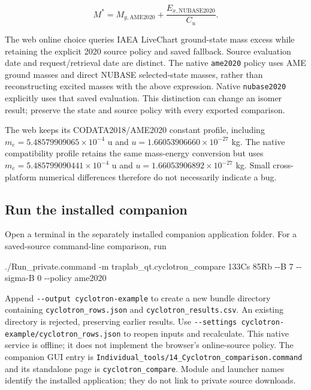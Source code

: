 \documentclass[
  aps,
  onecolumn,
  11pt]{revtex4-2}
\newenvironment{Shaded}{}{}
\newcommand{\AttributeTok}[1]{\textcolor[rgb]{0.49,0.56,0.16}{#1}}
\newcommand{\ExtensionTok}[1]{#1}
\newcommand{\NormalTok}[1]{#1}
\begin{document}
\[M^*=M_{g,\mathrm{AME2020}}+\frac{E_{x,\mathrm{NUBASE2020}}}{C_u}.\]

The web online choice queries IAEA LiveChart ground-state mass excess
while retaining the explicit 2020 source policy and saved fallback.
Source evaluation date and request/retrieval date are distinct. The
native \texttt{ame2020} policy uses AME ground masses and direct NUBASE
selected-state masses, rather than reconstructing excited masses with
the above expression. Native \texttt{nubase2020} explicitly uses that
saved evaluation. This distinction can change an isomer result; preserve
the state and source policy with every exported comparison.

The web keeps its CODATA2018/AME2020 constant profile, including
\(m_e=5.48579909065\times10^{-4}\) u and
\(u=1.66053906660\times10^{-27}\) kg. The native compatibility profile
retains the same mass-energy conversion but uses
\(m_e=5.485799090441\times10^{-4}\) u and
\(u=1.66053906892\times10^{-27}\) kg. Small cross-platform numerical
differences therefore do not necessarily indicate a bug.

\subsection{Run the installed
companion}\label{run-the-installed-companion}

Open a terminal in the separately installed companion application
folder. For a saved-source command-line comparison, run

\begin{Shaded}
\begin{Highlighting}[]
\ExtensionTok{./Run\_private.command} \AttributeTok{{-}m}\NormalTok{ traplab\_qt.cyclotron\_compare 133Cs 85Rb }\AttributeTok{{-}{-}B}\NormalTok{ 7 }\AttributeTok{{-}{-}sigma{-}B}\NormalTok{ 0 }\AttributeTok{{-}{-}policy}\NormalTok{ ame2020}
\end{Highlighting}
\end{Shaded}

Append \texttt{-\/-output\ cyclotron-example} to create a new bundle
directory containing \texttt{cyclotron\_rows.json} and
\texttt{cyclotron\_results.csv}. An existing directory is rejected,
preserving earlier results. Use
\texttt{-\/-settings\ cyclotron-example/cyclotron\_rows.json} to reopen
inputs and recalculate. This native service is offline; it does not
implement the browser's online-source policy. The companion GUI entry is
\texttt{Individual\_tools/14\_Cyclotron\_comparison.command} and its
standalone page is \texttt{cyclotron\_compare}. Module and launcher
names identify the installed application; they do not link to private
source downloads.
\end{document}
